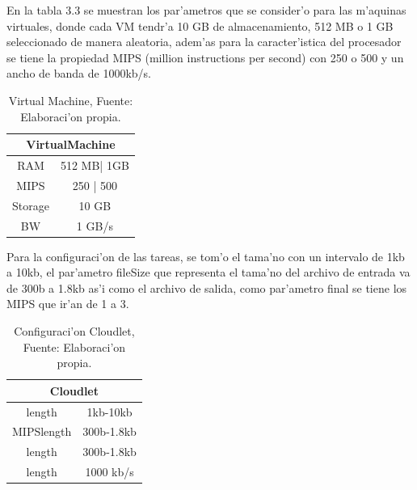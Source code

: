 En la tabla 3.3 se muestran los par'ametros que se consider'o para las m'aquinas virtuales, donde cada VM tendr'a 10 GB de almacenamiento, 512 MB  o 1 GB seleccionado de manera aleatoria, adem'as para la caracter'istica del procesador se tiene  la propiedad MIPS (million instructions per second) con 250 o 500 y un ancho de banda de 1000kb/s.


\begin{table}[]
	\centering
	\caption{Virtual Machine, Fuente: Elaboraci'on propia.}
	\label{my-label}
	\begin{tabular}{@{}cc@{}}
		\toprule
		\multicolumn{2}{c}{{\bf VirtualMachine}} \\ \midrule
		RAM               & 512 MB| 1GB          \\
		MIPS              & 250 | 500            \\
		Storage           & 10 GB                \\ \midrule
		BW                & 1 GB/s              
	\end{tabular}
\end{table}


Para la configuraci'on de las tareas, se tom'o el tama'no con un intervalo de 1kb a 10kb,  el par'ametro fileSize que representa el tama'no del archivo de entrada va de 300b a 1.8kb as'i como el archivo de salida, como par'ametro final se tiene los MIPS que ir'an de 1 a 3.



\begin{table}[]
	\centering
	\caption{Configuraci'on Cloudlet, Fuente: Elaboraci'on propia.}
	\label{my-label}
	\begin{tabular}{@{}cc@{}}
		\toprule
		\multicolumn{2}{c}{{\bf Cloudlet}} \\ \midrule
		length           & 1kb-10kb        \\
		MIPSlength       & 300b-1.8kb      \\
		length           & 300b-1.8kb      \\ \midrule
		length           & 1000 kb/s      
	\end{tabular}
\end{table}

